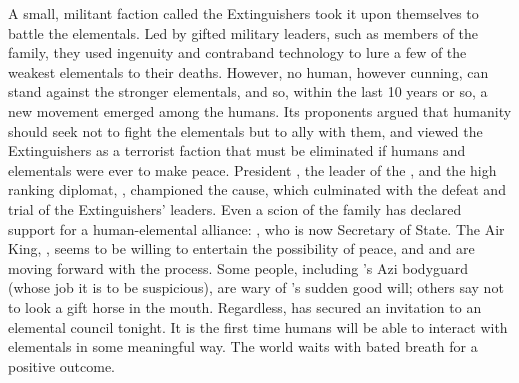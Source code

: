 \documentclass[blue]{elementals}
\begin{document}
A small, militant faction called the Extinguishers took it upon themselves to battle the elementals.  Led by gifted military leaders, such as members of the \cDema{\formal} family, they used ingenuity and contraband technology to lure a few of the weakest elementals to their deaths.  However, no human, however cunning, can stand against the stronger elementals, and so, within the last 10 years or so, a new movement emerged among the humans. Its proponents argued that humanity should seek not to fight the elementals but to ally with them, and viewed the Extinguishers as a terrorist faction that must be eliminated if humans and elementals were ever to make peace. President \cLeader{\full}, the leader of the \cNewUN{\full}, and the high ranking diplomat, \cAvatar{\full}, championed the cause, which culminated with the defeat and trial of the Extinguishers' leaders. Even a scion of the \cDema{\formal} family has declared support for a human-elemental alliance: \cDema{}, who is now Secretary of State. The Air King, \cKing{}, seems to be willing to entertain the possibility of peace, and \cLeader{} and \cAvatar{} are moving forward with the process. Some people, including \cLeader{}'s Azi bodyguard \cRomeo{\full} (whose job it is to be suspicious), are wary of \cKing{}'s sudden good will; others say not to look a gift horse in the mouth. Regardless, \cLeader{} has secured an invitation to an elemental council tonight. It is the first time humans will be able to interact with elementals in some meaningful way. The world waits with bated breath for a positive outcome.

\end{document}
